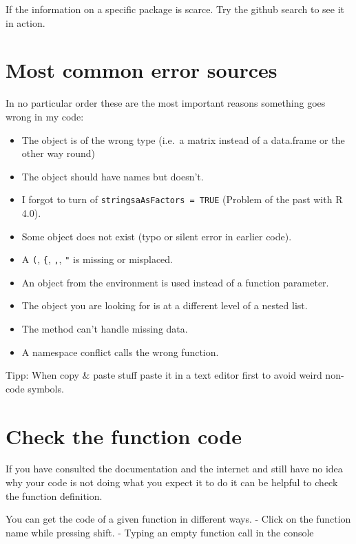 \documentclass[]{book}
\providecommand{\tightlist}{%
  \setlength{\itemsep}{0pt}\setlength{\parskip}{0pt}}
\begin{document}
If the information on a specific package is scarce.
Try the github search to see it in action.

\hypertarget{most-common-error-sources}{%
\chapter{Most common error sources}\label{most-common-error-sources}}

In no particular order these are the most important reasons something goes
wrong in my code:

\begin{itemize}
\tightlist
\item
  The object is of the wrong type (i.e.~a matrix instead of a data.frame or the other way round)
\item
  The object should have names but doesn't.
\item
  I forgot to turn of \texttt{stringsaAsFactors\ =\ TRUE}
  (Problem of the past with R 4.0).
\item
  Some object does not exist (typo or silent error in earlier code).
\item
  A \texttt{(}, \texttt{\{}, \texttt{,}, \texttt{"} is missing or misplaced.
\item
  An object from the environment is used instead of a function parameter.
\item
  The object you are looking for is at a different level of a nested list.
\item
  The method can't handle missing data.
\item
  A namespace conflict calls the wrong function.
\end{itemize}

Tipp:
When copy \& paste stuff paste it in a text editor first to
avoid weird non-code symbols.

\hypertarget{check-the-function-code}{%
\chapter{Check the function code}\label{check-the-function-code}}

If you have consulted the documentation and the internet and still have no
idea why your code is not doing what you expect it to do it can be
helpful to check the function definition.

You can get the code of a given function in different ways.
- Click on the function name while pressing shift.
- Typing an empty function call in the console
\end{document}
